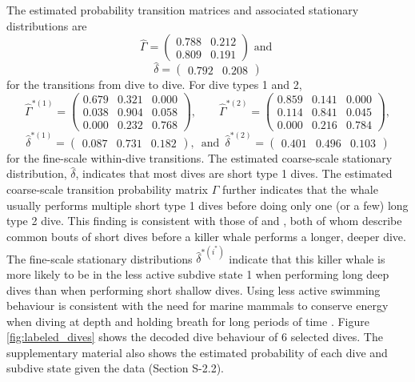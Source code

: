 The estimated probability transition matrices and associated stationary distributions are
%
$$\hat \Gamma = \begin{pmatrix} 
0.788 & 0.212 \\
0.809 & 0.191
\end{pmatrix} \text{ and }$$
$$\hat \delta = \begin{pmatrix} 0.792 & 0.208 \end{pmatrix}$$
%
for the transitions from dive to dive. For dive types 1 and 2,
$$\hat \Gamma^{*(1)} = \begin{pmatrix} 
0.679 & 0.321 & 0.000 \\
0.038 & 0.904 & 0.058 \\
0.000 & 0.232 & 0.768
\end{pmatrix}, \qquad 
\hat \Gamma^{*(2)} = \begin{pmatrix} 
0.859 & 0.141 & 0.000 \\
0.114 & 0.841 & 0.045 \\
0.000 & 0.216 & 0.784
\end{pmatrix},$$
$$\hat \delta^{*(1)} = \begin{pmatrix} 0.087 & 0.731 & 0.182 \end{pmatrix}, \enspace \text{and} \enspace \hat \delta^{*(2)} = \begin{pmatrix} 0.401 & 0.496 & 0.103 \end{pmatrix}$$
%
for the fine-scale within-dive transitions.
The estimated coarse-scale stationary distribution, $\hat{\delta}$, indicates that most dives are short type 1 dives. The estimated coarse-scale transition probability matrix $\hat \Gamma$ further indicates that the whale usually performs multiple short type 1 dives before doing only one (or a few) long type 2 dive. This finding is consistent with those of \citet{Tennessen:2019b} and \citet{Williams:2009}, both of whom describe common bouts of short dives before a killer whale performs a longer, deeper dive. The fine-scale stationary distributions $\hat{\delta}^{*(i^*)}$ indicate that this killer whale is more likely to be in the less active subdive state 1 when performing long deep dives than when performing short shallow dives. Using less active swimming behaviour is consistent with the need for marine mammals to conserve energy when diving at depth and holding breath for long periods of time \citep{Williams:1999,Hastie:2006}. Figure \ref{fig:labeled_dives} shows the decoded dive behaviour of 6 selected dives. The supplementary material also shows the estimated probability of each dive and subdive state given the data (Section S-2.2).

